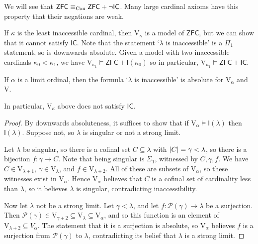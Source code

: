 We will see that \( \mathsf{ZFC} \equiv_{\operatorname{Con}} \mathsf{ZFC} + \neg\mathsf{IC} \).
Many large cardinal axioms have this property that their negations are weak.

If \( \kappa \) is the least inaccessible cardinal, then \( \mathrm{V}_\kappa \) is a model of \( \mathsf{ZFC} \), but we can show that it cannot satisfy \( \mathsf{IC} \).
Note that the statement `\( \lambda \) is inaccessible' is a \( \Pi_1 \) statement, so is downwards absolute.
Given a model with two inaccessible cardinals \( \kappa_0 < \kappa_1 \), we have \( \mathrm{V}_{\kappa_1} \vDash \mathsf{ZFC} + \mathsf{I}(\kappa_0) \) so in particular, \( \mathrm{V}_{\kappa_1} \vDash \mathsf{ZFC} + \mathsf{IC} \).
\begin{lemma}
    If \( \alpha \) is a limit ordinal, then the formula `\( \lambda \) is inaccessible' is absolute for \( \mathrm{V}_\alpha \) and \( \mathrm{V} \).
\end{lemma}
In particular, \( \mathrm{V}_\kappa \) above does not satisfy \( \mathsf{IC} \).
\begin{proof}
    By downwards absoluteness, it suffices to show that if \( \mathrm{V}_\alpha \vDash \mathsf{I}(\lambda) \) then \( \mathsf{I}(\lambda) \).
    Suppose not, so \( \lambda \) is singular or not a strong limit.

    Let \( \lambda \) be singular, so there is a cofinal set \( C \subseteq \lambda \) with \( \abs{C} = \gamma < \lambda \), so there is a bijection \( f : \gamma \to C \).
    Note that being singular is \( \Sigma_1 \), witnessed by \( C, \gamma, f \).
    We have \( C \in \mathrm{V}_{\lambda + 1} \), \( \gamma \in \mathrm{V}_\lambda \), and \( f \in \mathrm{V}_{\lambda + 2} \).
    All of these are subsets of \( \mathrm{V}_\alpha \), so these witnesses exist in \( \mathrm{V}_\alpha \).
    Hence \( \mathrm{V}_\alpha \) believes that \( C \) is a cofinal set of cardinality less than \( \lambda \), so it believes \( \lambda \) is singular, contradicting inaccessibility.

    Now let \( \lambda \) not be a strong limit.
    Let \( \gamma < \lambda \), and let \( f : \mathcal P(\gamma) \to \lambda \) be a surjection.
    Then \( \mathcal P(\gamma) \in \mathrm{V}_{\gamma + 2} \subseteq \mathrm{V}_\lambda \subseteq \mathrm{V}_\alpha \), and so this function is an element of \( \mathrm{V}_{\lambda + 2} \subseteq V_\alpha \).
    The statement that it is a surjection is absolute, so \( \mathrm{V}_\alpha \) believes \( f \) is a surjection from \( \mathcal P(\gamma) \) to \( \lambda \), contradicting its belief that \( \lambda \) is a strong limit.
\end{proof}
